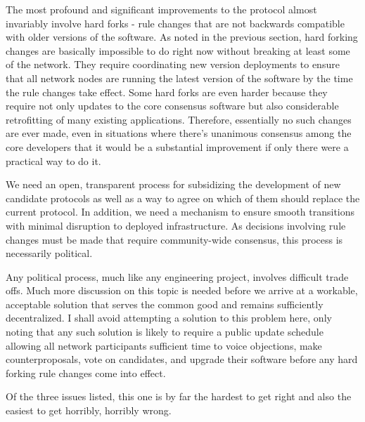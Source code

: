 \documentclass{article}
\begin{document}
The most profound and significant improvements to the protocol almost invariably involve hard forks - rule changes that are not backwards compatible with older versions of the software. As noted in the previous section, hard forking changes are basically impossible to do right now without breaking at least some of the network. They require coordinating new version deployments to ensure that all network nodes are running the latest version of the software by the time the rule changes take effect. Some hard forks are even harder because they require not only updates to the core consensus software but also considerable retrofitting of many existing applications. Therefore, essentially no such changes are ever made, even in situations where there's unanimous consensus among the core developers that it would be a substantial improvement if only there were a practical way to do it.

We need an open, transparent process for subsidizing the development of new candidate protocols as well as a way to agree on which of them should replace the current protocol. In addition, we need a mechanism to ensure smooth transitions with minimal disruption to deployed infrastructure. As decisions involving rule changes must be made that require community-wide consensus, this process is necessarily political.

Any political process, much like any engineering project, involves difficult trade offs. Much more discussion on this topic is needed before we arrive at a workable, acceptable solution that serves the common good and remains sufficiently decentralized. I shall avoid attempting a solution to this problem here, only noting that any such solution is likely to require a public update schedule allowing all network participants sufficient time to voice objections, make counterproposals, vote on candidates, and upgrade their software before any hard forking rule changes come into effect.

Of the three issues listed, this one is by far the hardest to get right and also the easiest to get horribly, horribly wrong.
\end{document}
